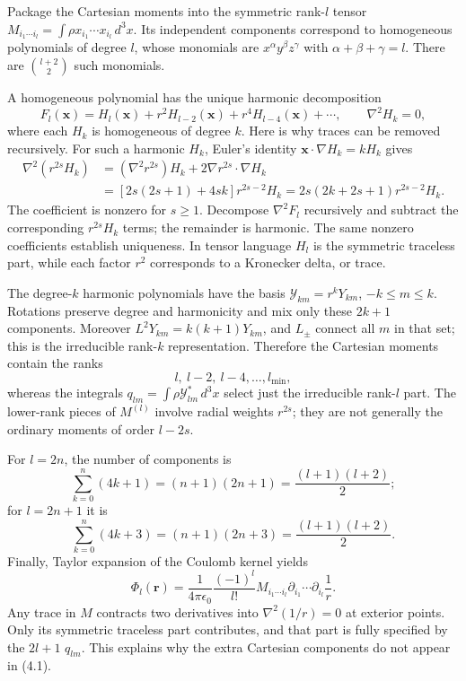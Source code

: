 Package the Cartesian moments into the symmetric rank-$l$ tensor
$M_{i_1\cdots i_l}=\int\rho x_{i_1}\cdots x_{i_l}\,d^3x$.
Its independent components correspond to homogeneous polynomials of degree
$l$, whose monomials are $x^\alpha y^\beta z^\gamma$ with
$\alpha+\beta+\gamma=l$. There are $\binom{l+2}{2}$ such monomials.

A homogeneous polynomial has the unique harmonic decomposition
\[
F_l(\mathbf x)=H_l(\mathbf x)+r^2H_{l-2}(\mathbf x)
+r^4H_{l-4}(\mathbf x)+\cdots,
\qquad \nabla^2H_k=0,
\]
where each $H_k$ is homogeneous of degree $k$. Here is why traces can
be removed recursively. For such a harmonic $H_k$, Euler's identity
$\mathbf x\cdot\nabla H_k=kH_k$ gives
\begin{align*}
\nabla^2(r^{2s}H_k)
&=(\nabla^2r^{2s})H_k+2\nabla r^{2s}\cdot\nabla H_k\\
&=[2s(2s+1)+4sk]r^{2s-2}H_k
=2s(2k+2s+1)r^{2s-2}H_k.
\end{align*}
The coefficient is nonzero for $s\geq1$. Decompose $\nabla^2F_l$
recursively and subtract the corresponding $r^{2s}H_k$ terms; the
remainder is harmonic. The same nonzero coefficients establish uniqueness.
In tensor language $H_l$ is the symmetric traceless part, while each
factor $r^2$ corresponds to a Kronecker delta, or trace.

The degree-$k$ harmonic polynomials have the basis
$\mathcal Y_{km}=r^kY_{km}$, $-k\leq m\leq k$.
Rotations preserve degree and harmonicity and mix only these $2k+1$
components. Moreover $L^2Y_{km}=k(k+1)Y_{km}$, and $L_\pm$ connect all
$m$ in that set; this is the irreducible rank-$k$ representation.
Therefore the Cartesian moments contain the ranks
\[
\boxed{l,\ l-2,\ l-4,\ldots,l_{\min},}
\]
whereas the integrals $q_{lm}=\int\rho\mathcal Y_{lm}^{*}\,d^3x$
select just the irreducible rank-$l$ part. The lower-rank pieces of
$M^{(l)}$ involve radial weights $r^{2s}$; they are not generally the
ordinary moments of order $l-2s$.

For $l=2n$, the number of components is
\[
\sum_{k=0}^n(4k+1)=(n+1)(2n+1)
=\frac{(l+1)(l+2)}2;
\]
for $l=2n+1$ it is
\[
\sum_{k=0}^n(4k+3)=(n+1)(2n+3)
=\frac{(l+1)(l+2)}2.
\]
Finally, Taylor expansion of the Coulomb kernel yields
\[
\Phi_l(\mathbf r)=\frac{1}{4\pi\epsilon_0}
\frac{(-1)^l}{l!}M_{i_1\cdots i_l}
\partial_{i_1}\cdots\partial_{i_l}\frac1r.
\]
Any trace in $M$ contracts two derivatives into
$\nabla^2(1/r)=0$ at exterior points. Only its symmetric traceless
part contributes, and that part is fully specified by the $2l+1$
$q_{lm}$. This explains why the extra Cartesian components do not
appear in (4.1).

